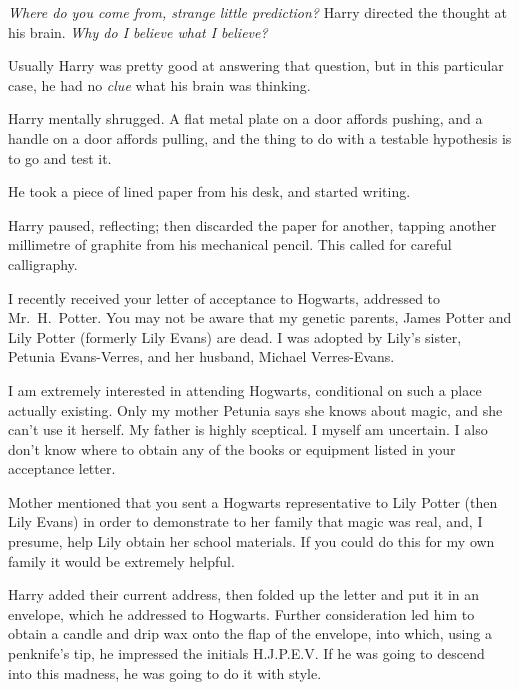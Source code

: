 \emph{Where do you come from, strange little prediction?} Harry directed the 
thought at his brain. \emph{Why do I believe what I believe?}

Usually Harry was pretty good at answering that question, but in this 
particular case, he had no \emph{clue} what his brain was thinking.

Harry mentally shrugged. A flat metal plate on a door affords pushing, and a 
handle on a door affords pulling, and the thing to do with a testable 
hypothesis is to go and test it.

He took a piece of lined paper from his desk, and started writing.

\begin{writtenNote}
\end{writtenNote}

Harry paused, reflecting; then discarded the paper for another, tapping another 
millimetre of graphite from his mechanical pencil. This called for careful 
calligraphy.

\begin{writtenNote}


I recently received your letter of acceptance to Hogwarts, addressed to 
Mr.~H.~Potter. You may not be aware that my genetic parents, James Potter and 
Lily Potter (formerly Lily Evans) are dead. I was adopted by Lily's sister, 
Petunia Evans-Verres, and her husband, Michael Verres-Evans.

I am extremely interested in attending Hogwarts, conditional on such a 
place actually existing. Only my mother Petunia says she knows about magic, and 
she can't use it herself. My father is highly sceptical. I myself am uncertain. 
I also don't know where to obtain any of the books or equipment listed in your 
acceptance letter.

Mother mentioned that you sent a Hogwarts representative to Lily Potter 
(then Lily Evans) in order to demonstrate to her family that magic was real, 
and, I presume, help Lily obtain her school materials. If you could do this for 
my own family it would be extremely helpful.

\end{writtenNote}

Harry added their current address, then folded up the letter and put it in an 
envelope, which he addressed to Hogwarts. Further consideration led him to 
obtain a candle and drip wax onto the flap of the envelope, into which, using a 
penknife's tip, he impressed the initials H.J.P.E.V. If he was going to descend 
into this madness, he was going to do it with style.


